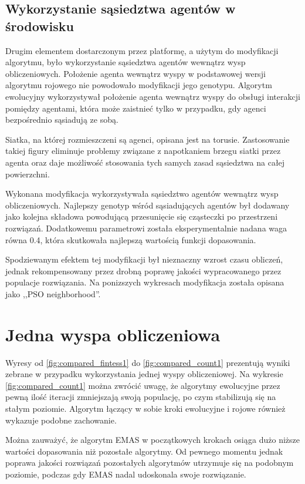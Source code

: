 \subsection{Wykorzystanie sąsiedztwa agentów w środowisku}

Drugim elementem dostarczonym przez platformę, a użytym do modyfikacji algorytmu, było wykorzystanie sąsiedztwa agentów wewnątrz wysp obliczeniowych. Położenie agenta wewnątrz wyspy w podstawowej wersji algorytmu rojowego nie powodowało modyfikacji jego genotypu. Algorytm ewolucyjny wykorzystywał położenie agenta wewnątrz wyspy do obsługi interakcji pomiędzy agentami, która może zaistnieć tylko w przypadku, gdy agenci bezpośrednio sąsiadują ze sobą.

Siatka, na której rozmieszczeni są agenci, opisana jest na torusie. Zastosowanie takiej figury eliminuje problemy związane z napotkaniem brzegu siatki przez agenta oraz daje możliwość stosowania tych samych zasad sąsiedztwa na całej powierzchni.

Wykonana modyfikacja wykorzystywała sąsiedztwo agentów wewnątrz wysp obliczeniowych. Najlepszy genotyp wśród sąsiadujących agentów był dodawany jako kolejna składowa powodującą przesunięcie się cząsteczki po przestrzeni rozwiązań. Dodatkowemu parametrowi została eksperymentalnie nadana waga równa 0.4, która skutkowała najlepszą wartością funkcji dopasowania.

Spodziewanym efektem tej modyfikacji był nieznaczny wzrost czasu obliczeń, jednak rekompensowany przez drobną poprawę jakości wypracowanego przez populacje rozwiązania. Na ponizszych wykresach modyfikacja została opisana jako ,,PSO neighborhood''.

\section{Jedna wyspa obliczeniowa}
\label{sec:jednawyspa}

Wyresy od \ref{fig:compared_fintess1} do \ref{fig:compared_count1} prezentują wyniki zebrane w przypadku wykorzystania jednej wyspy obliczeniowej. Na wykresie \ref{fig:compared_count1} można zwrócić uwagę, że algorytmy ewolucyjne przez pewną ilość iteracji zmniejszają swoją populację, po czym stabilizują się na stałym poziomie. Algorytm łączący w sobie kroki ewolucyjne i rojowe również wykazuje podobne zachowanie.

Można zauważyć, że algorytm EMAS w początkowych krokach osiąga dużo niższe wartości dopasowania niż pozostałe algorytmy. Od pewnego momentu jednak poprawa jakości rozwiązań pozostałych algorytmów utrzymuje się na podobnym poziomie, podczas gdy EMAS nadal udoskonala swoje rozwiązanie. 

